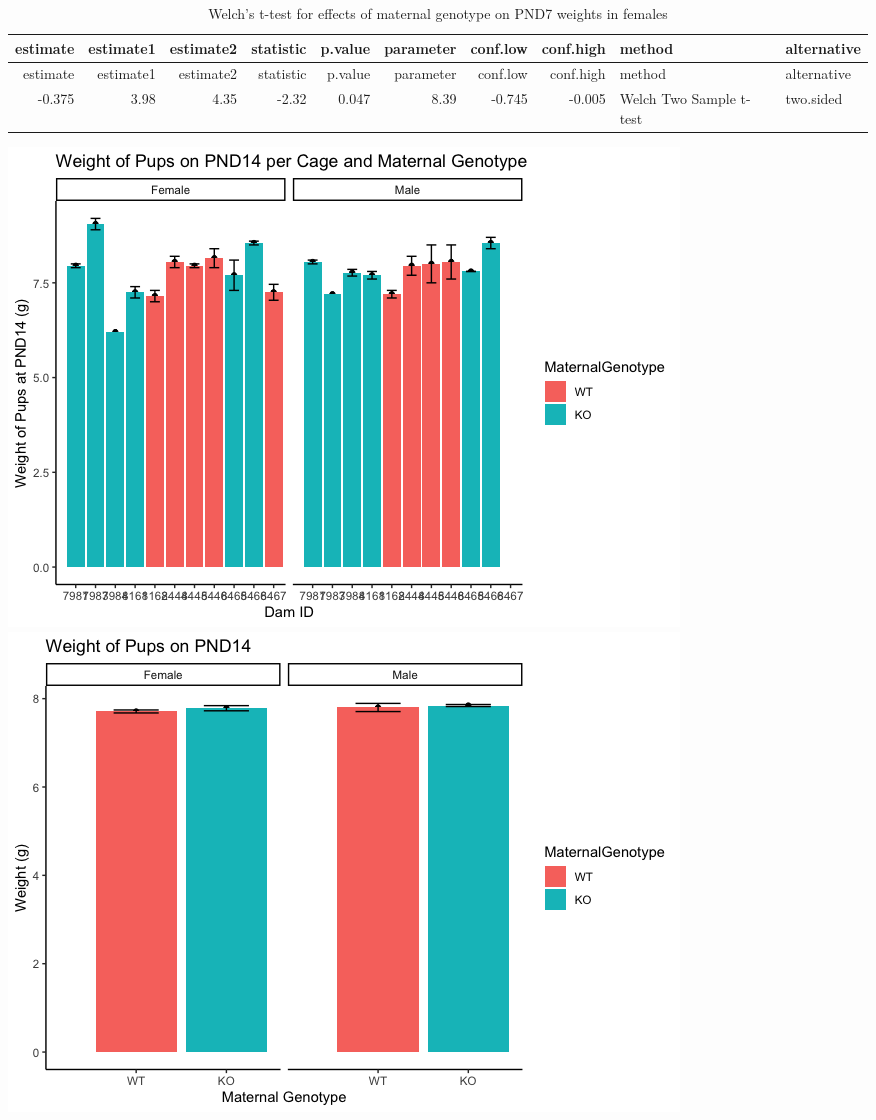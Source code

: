 \documentclass[]{article}
\begin{document}
\begin{longtable}[]{@{}rrrrrrrrll@{}}
\caption{Welch's t-test for effects of maternal genotype on PND7 weights
in females}\tabularnewline
\toprule
estimate & estimate1 & estimate2 & statistic & p.value & parameter &
conf.low & conf.high & method & alternative\tabularnewline
\midrule
\endfirsthead
\toprule
estimate & estimate1 & estimate2 & statistic & p.value & parameter &
conf.low & conf.high & method & alternative\tabularnewline
\midrule
\endhead
-0.375 & 3.98 & 4.35 & -2.32 & 0.047 & 8.39 & -0.745 & -0.005 & Welch
Two Sample t-test & two.sided\tabularnewline
\bottomrule
\end{longtable}

\includegraphics{figures/PUPweight_graphsPND14-1.png}
\includegraphics{figures/PUPweight_graphsPND14-2.png}
\end{document}
